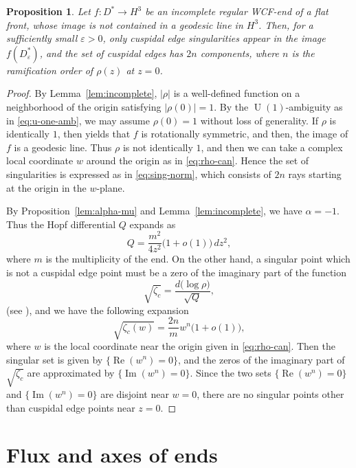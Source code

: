 \documentclass[a4paper]{amsart}
\theoremstyle{plain}
\newtheorem{proposition}[theorem]{Proposition}
\theoremstyle{remark}
\numberwithin{equation}{section}
\begin{document}
\begin{proposition}\label{lem:cuspidal}
 Let $f \colon D^*\to H^3$ be an incomplete regular WCF-end
 of a flat front, 
 whose  image is not contained in a geodesic line in $H^3$.
 Then, for a sufficiently small $\varepsilon>0$,
 only cuspidal edge singularities 
 appear in the image $f(D^*_\varepsilon)$,
 and the set of cuspidal edges has $2n$ components,
 where $n$ is the ramification order of 
 $\rho(z)$ at $z=0$.
\end{proposition}
\begin{proof}
 By Lemma~\ref{lem:incomplete},  
 $|\rho|$ is a well-defined function on a neighborhood of the origin
 satisfying $|\rho(0)|=1$.
 By the ${\operatorname{U}}(1)$-ambiguity as in \eqref{eq:u-one-amb},
 we may assume $\rho(0)=1$ without loss of generality.
 If $\rho$ is identically $1$, then
 \cite[Proposition 4.7]{KRSUY} yields that $f$ is rotationally
 symmetric, and then, the image of $f$ is a geodesic line.
 Thus  $\rho$ is not identically $1$, and then
 we can take a complex local coordinate $w$
 around the origin  as in \eqref{eq:rho-can}.
 Hence the set of singularities is expressed as in \eqref{eq:sing-norm},
 which consists of $2n$ rays starting at the origin 
 in the $w$-plane.

 By Proposition~\ref{lem:alpha-mu} and Lemma~\ref{lem:incomplete}, 
 we have $\alpha=-1$.
 Thus the Hopf differential $Q$ expands as 
 \begin{equation}\label{eq:Q-top-incomplete}
      Q = \frac{m^2}{4z^2}\bigl(1+o(1)\bigr)\,dz^2,
 \end{equation}
 where $m$ is the multiplicity of the end.
 On the other hand, a singular point which is not a cuspidal edge point
 must be a zero of the imaginary part of 
 the function 
 \[
    \sqrt{\zeta_c}
            =\frac{d\bigl(\log\rho\bigr)}{\sqrt{Q}},
 \]
 (see \cite[Proposition~4.7]{KRSUY}), and we have the following expansion
 \[
     \sqrt{\zeta_c(w)}=\frac{2n}{m} w^{n}\bigl(1+o(1)\bigr),
 \]
 where $w$ is the local coordinate near the origin given in
 \eqref{eq:rho-can}.
 Then the singular set is given by $\{{\operatorname{Re}}(w^n)=0\}$, and 
 the zeros of the imaginary part of $\sqrt{\zeta_c}$ are approximated by 
 $\{{\operatorname{Im}}(w^n)=0\}$.
 Since  the two  sets $\{{\operatorname{Re}}(w^n)=0\}$ and 
 $\{{\operatorname{Im}}(w^n)=0\}$ are disjoint near $w=0$,
 there are no singular points  
 other than cuspidal edge points near $z=0$.
\end{proof}

\section{Flux and axes of ends}\label{sec:flux}
\end{document}
